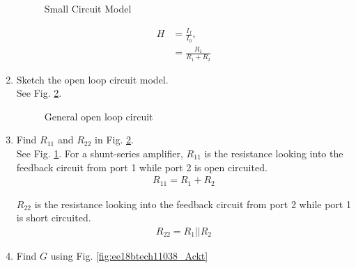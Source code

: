 \begin{enumerate}[label=\arabic*.,ref=\theenumi]
\begin{figure}[!ht]
\begin{center}
		\resizebox{\columnwidth}{!}{}
	\end{center}
\caption{Small Circuit Model}
\label{fig:ee18btech11038_smlckt}
\end{figure}

\begin{align}
    H &= \frac{I_{f}}{I_{0}}, 
\\
     &= \frac{R_{1}}{R_{1} + R_{2}}
\end{align}
%
\item Sketch the open loop circuit model.
\\
\solution See  Fig. \ref{fig:ee18btech11038_genamp}.
%
\begin{figure}[!ht]
	\begin{center}
		
		\resizebox{\columnwidth}{!}{}
	\end{center}
\caption{General open loop circuit}
\label{fig:ee18btech11038_genamp}
\end{figure}

\item Find $R_{11}$ and $R_{22}$ in Fig. \ref{fig:ee18btech11038_genamp}.
\\
\solution See Fig. \ref{fig:ee18btech11038_smlckt}.
For a shunt-series amplifier, $R_{11}$ is the resistance looking into the feedback circuit from port 1 while port 2 is open circuited.
\begin{align}
    R_{11} = R_{1} + R_{2}
\end{align}

$R_{22}$ is the resistance looking into the feedback circuit from port 2 while port 1 is short circuited.
\begin{align}
    R_{22} = R_{1}||R_{2}
\end{align}

\item Find $G$ using Fig. \ref{fig:ee18btech11038_Ackt}

\begin{figure}[!ht]
	\begin{center}
		

\end{center}
\end{figure}
\end{enumerate}
